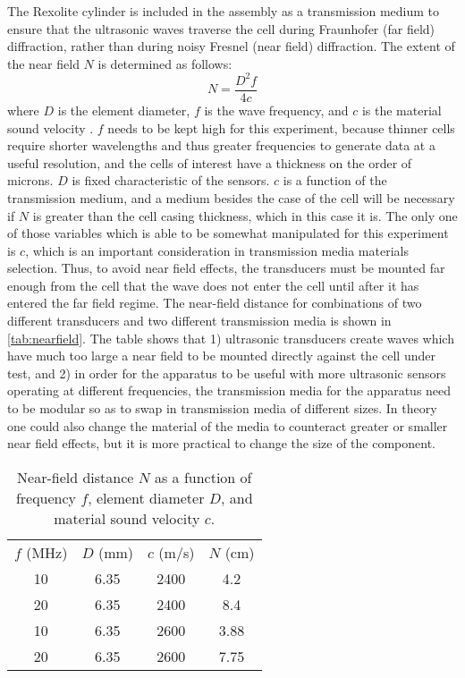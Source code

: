 The Rexolite cylinder is included in the assembly as a transmission medium to ensure that the ultrasonic waves traverse the cell during Fraunhofer (far field) diffraction, rather than during noisy Fresnel (near field) diffraction. The extent of the near field $N$ is determined as follows:
$$ N= \frac{D^2 f} {4c} $$
where $D$ is the element diameter, $f$ is the wave frequency, and $c$ is the material sound velocity \cite{OLYMPUS}.
$f$ needs to be kept high for this experiment, because thinner cells require shorter wavelengths and thus greater frequencies to generate data at a useful resolution, and the cells of interest have a thickness on the order of microns. $D$ is fixed characteristic of the sensors. $c$ is a function of the transmission medium, and a medium besides the case of the cell will be necessary if $N$ is greater than the cell casing thickness, which in this case it is. The only one of those variables which is able to be somewhat manipulated for this experiment is $c$, which is an important consideration in transmission media materials selection. Thus, to avoid near field effects, the transducers must be mounted far enough from the cell that the wave does not enter the cell until after it has entered the far field regime. The near-field distance for combinations of two different transducers and two different transmission media is shown in \autoref{tab:nearfield}. The table shows that 1) ultrasonic transducers create waves which have much too large a near field to be mounted directly against the cell under test, and 2) in order for the apparatus to be useful with more ultrasonic sensors operating at different frequencies, the transmission media for the apparatus need to be modular so as to swap in transmission media of different sizes. In theory one could also change the material of the media to counteract greater or smaller near field effects, but it is more practical to change the size of the component. 

\begin{table}[]
    \centering
    \begin{tabular}{c|c|c|c}
         $f$ (MHz) & $D$ (mm) & $c$ (m/s) & $N$ (cm) \\
         10 & 6.35 & 2400 & 4.2 \\
         20 & 6.35 & 2400 & 8.4 \\
         10 & 6.35 & 2600 & 3.88 \\
         20 & 6.35 & 2600 & 7.75 \\
    \end{tabular}
    \caption{Near-field distance $N$ as a function of frequency $f$, element diameter $D$, and material sound velocity $c$.}
    \label{tab:nearfield}
\end{table} 

